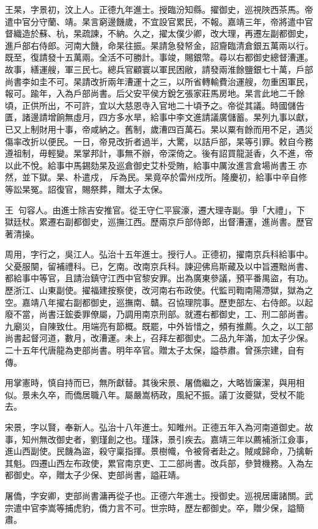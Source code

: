 \begin{pinyinscope}
王杲，字景初，汶上人。正德九年進士。授臨汾知縣。擢御史，巡視陜西茶馬。帝遣中官分守蘭、靖。杲言窮邊饑歲，不宜設官累民，不報。嘉靖三年，帝將遣中官督織造於蘇、杭，杲疏諫，不納。久之，擢太僕少卿，改大理，再遷左副都御史，進戶部右侍郎。河南大饑，命杲往振。杲請急發帑金，詔齎臨清倉銀五萬兩以行。既至，復請發十五萬兩。全活不可勝計。事竣，賜銀幣。尋以右都御史總督漕運。故事，繕運艘，軍三民七。總兵官顧寰以軍民困敝，請發兩淮餘鹽銀七十萬，戶部尚書李如圭不可。杲請改折兩年漕運十之三，以所省轉輸費治運艘，勿重困軍民，報可。踰年，入為戶部尚書。后父安平侯方銳乞張家莊馬房地。杲言此地二千餘頃，正供所出，不可許，宜以大慈恩寺入官地二十頃予之。帝從其議。時國儲告匱，諸邊請增餉無虛月，四方多水旱，給事中李文進請議廣儲蓄。杲列九事以獻，已又上制財用十事，帝咸納之。舊制，歲漕四百萬石。杲以粟有餘而用不足，遇災傷率改折以便民。一日，帝見改折者過半，大驚，以詰戶部，杲等引罪。敕自今務遵祖制，毋輕變。杲掌邦計，事無不辦，帝深倚之。後有詔買龍涎香，久不進，帝以此不悅。給事中馬錫劾杲及巡倉御史艾朴受賄，給事中厲汝進言倉場尚書王亦然，並下獄。杲、朴遣戍，斥為民。杲竟卒於雷州戍所。隆慶初，給事中辛自修等訟杲冤。詔復官，賜祭葬，贈太子太保。

王，句容人。由進士除吉安推官。從王守仁平宸濠，遷大理寺副。爭「大禮」，下獄廷杖。累遷右副都御史，巡撫江西。歷兩京戶部侍郎，出督漕運，進尚書。歷官著清操。

周用，字行之，吳江人。弘治十五年進士。授行人。正德初，擢南京兵科給事中。父憂服闋，留補禮科。已，乞南。改南京兵科。諫迎佛烏斯藏及以中旨遷黜尚書、都給事中等官，且請治鎮守江西中官黎安罪。出為廣東參議，預平番禺盜，有功。歷浙江、山東副使。擢福建按察使，改河南右布政使。代監司鞫南陽滯獄，獄為之空。嘉靖八年擢右副都御史，巡撫南、贛。召協理院事。歷吏部左、右侍郎。以起廢不當，尚書汪鋐委罪僚屬，乃調用南京刑部。就遷右都御史，工、刑二部尚書。九廟災，自陳致仕。用端亮有節概。既罷，中外皆惜之，頻有推薦。久之，以工部尚書起督河道，數月，改漕運。未上，召拜左都御史。二品九年滿，加太子少保。二十五年代唐龍為吏部尚書。明年卒官。贈太子太保，謚恭肅。曾孫宗建，自有傳。

用掌憲時，慎自持而已，無所獻替。其後宋景、屠僑繼之，大略皆廉潔，與用相似。景未久卒，而僑居職八年。屬嚴嵩柄政，風紀不振。議丁汝夔獄，受杖不能去。

宋景，字以賢，奉新人。弘治十八年進士。知睢州。正德五年入為河南道御史。故事，知州無改御史者，劉瑾創之也。瑾誅，景引疾去。嘉靖三年以薦補浙江僉事，進山西副使。民饑為盜，殺守稟指揮。景樹幟，令被脅者赴之。賊咸歸命，乃擒斬其魁。四遷山西左布政使，累官南京吏、工二部尚書。改兵部，參贊機務。入為左都御史。卒，贈太子少保、吏部尚書，謚莊靖。

屠僑，字安卿，吏部尚書滽再從子也。正德六年進士。授御史。巡視居庸諸關。武宗遣中官李嵩等捕虎豹，僑力言不可。世宗時，歷左都御史。卒，贈少保，謚簡肅。


\end{pinyinscope}
